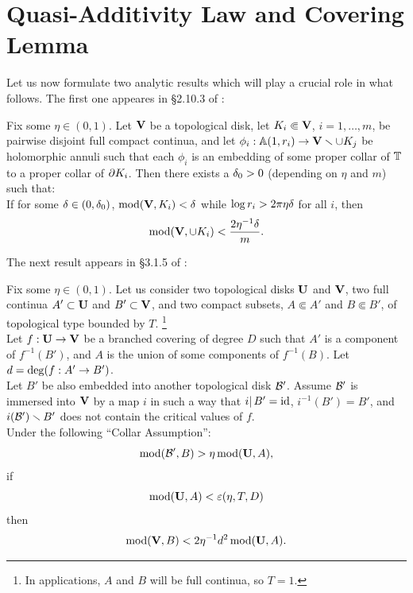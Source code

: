 

\section{Quasi-Additivity Law and Covering Lemma}\label{covering lemma sec}

Let us now formulate two analytic results
which will play a crucial role in what follows.
The first one appeares in \S 2.10.3 of \cite{covering lemma}:

\begin{qal}
    Fix some $\eta\in (0,1)$.
Let ${\mathbf{V}}$ be a topological disk,  let  $K_i\Subset {\mathbf{V}} $, $i=1,\dots, m$,
be pairwise disjoint full compact continua,
and let $\phi_i: {\Bbb A}(1,r_i)\rightarrow {\mathbf{V}} \smallsetminus   \cup K_j$
be holomorphic annuli such that each $\phi_i$ is
an  embedding of some proper collar of ${\Bbb T}$  to a proper collar of $\partial K_i$.
Then there exists a ${\delta}_0 > 0$ (depending on $\eta$ and $m$) such that: \\
If  for some ${\delta}\in (0, {\delta}_0)$,
$\operatorname{mod} ({\mathbf{V}}, K_i) < {\delta}$ while $\log r_i > 2\pi \eta{\delta}$  for all $i$,
then
$$
  \operatorname{mod}({\mathbf{V}},  \cup K_i ) < \frac{2 \eta^{-1} {\delta}}{m}.
$$
\end{qal}




The next result appears in \S 3.1.5 of \cite{covering lemma}:

\begin{covlem}
Fix some  $\eta\in (0,1)$. Let us consider
two topological disks ${\mathbf{U}}$ and ${\mathbf{V}}$, two full continua $A'\subset {\mathbf{U}}$ and $B'\subset {\mathbf{V}}$,
and two compact subsets, $A\Subset A'$ and $B\Subset B'$, of topological type bounded by $T$.%
\footnote{In applications, $A$ and $B$ will be full continua, so $T=1$. }
\\
  Let $f:{\mathbf{U}} \rightarrow {\mathbf{V}}$ be a branched covering of degree $D$ such that
$A'$ is a component of $f^{-1}(B')$, and $A$ is the union of some components of $f^{-1}(B)$.
Let $d=\deg(f : A'\rightarrow B')$.\\
Let $B'$ be also embedded into another topological disk ${\mathcal B}'$.
Assume ${\mathcal B}'$ is immersed into
${\mathbf{V}}$ by a map $i$  in such a way that $i|\, B'=\operatorname{id}$, $i^{-1}(B')=B'$,
 and $i({\mathcal B}') \smallsetminus B'$ does not contain the critical values of $f$.  \\
Under the following  ``Collar Assumption'':
$$
   \operatorname{mod}({\mathcal B}', B) > \eta \operatorname{mod}({\mathbf{U}},  A),
$$
if
$$ \operatorname{mod}({\mathbf{U}}, A) < {\varepsilon}(\eta,T, D) $$
 then
$$
      \operatorname{mod} ({\mathbf{V}}, B)  <  2 \eta^{-1} d^2 \operatorname{mod}({\mathbf{U}},  A).
$$
\end{covlem}
